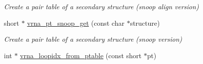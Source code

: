 \begin{DoxyCompactItemize}
\begin{DoxyCompactList}\small\item\em Create a pair table of a secondary structure (snoop align version) \end{DoxyCompactList}\item 
short $\ast$ \hyperlink{group__struct__utils_gaef0f7e1a6c00c81a349973de53039dda}{vrna\+\_\+pt\+\_\+snoop\+\_\+get} (const char $\ast$structure)
\begin{DoxyCompactList}\small\item\em Create a pair table of a secondary structure (snoop version) \end{DoxyCompactList}\item 
int $\ast$ \hyperlink{group__struct__utils_ga03e15af299be0866ff21da880c74b92e}{vrna\+\_\+loopidx\+\_\+from\+\_\+ptable} (const short $\ast$pt)\hypertarget{group__struct__utils_ga03e15af299be0866ff21da880c74b92e}{}\label{group__struct__utils_ga03e15af299be0866ff21da880c74b92e}


\end{DoxyCompactItemize}

